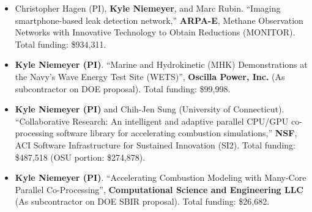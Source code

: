 \documentclass[margin,line,11pt]{res}
\begin{document}
\begin{resume}
\begin{itemize}[leftmargin=*]
\item Christopher Hagen (PI), \textbf{Kyle Niemeyer}, and Marc Rubin.
``Imaging smartphone-based leak detection network,''
\textbf{ARPA-E}, Methane Observation Networks with Innovative Technology to Obtain Reductions (MONITOR).
Total funding: \$934,311.

\item \textbf{Kyle Niemeyer (PI)}.
``Marine and Hydrokinetic (MHK) Demonstrations at the Navy's Wave Energy Test Site (WETS)'',
\textbf{Oscilla Power, Inc.} (As subcontractor on DOE proposal).
Total funding: \$99,998.

\item \textbf{Kyle Niemeyer (PI)} and Chih-Jen Sung (University of Connecticut).
``Collaborative Research: An intelligent and adaptive parallel CPU\slash GPU co-processing software library for accelerating combustion simulations,''
\textbf{NSF}, ACI Software Infrastructure for Sustained Innovation (SI2).
Total funding: \$487,518 (OSU portion: \$274,878).

\item \textbf{Kyle Niemeyer (PI)}.
``Accelerating Combustion Modeling with Many-Core Parallel Co-Pro\-cessing'',
\textbf{Computational Science and Engineering LLC} (As subcontractor on DOE SBIR proposal).
Total funding: \$26,682.

\end{itemize}

\end{resume}
\end{document}
